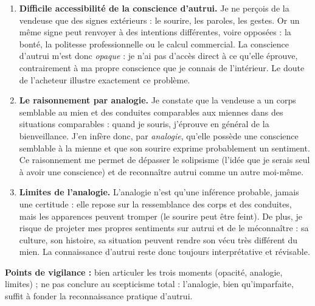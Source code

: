 \documentclass[11pt]{article}
\begin{document}
\begin{corrige}
\begin{enumerate}
\item \textbf{Difficile accessibilité de la conscience d'autrui.} Je ne perçois de la vendeuse que des signes extérieurs : le sourire, les paroles, les gestes. Or un même signe peut renvoyer à des intentions différentes, voire opposées : la bonté, la politesse professionnelle ou le calcul commercial. La conscience d'autrui m'est donc \emph{opaque} : je n'ai pas d'accès direct à ce qu'elle éprouve, contrairement à ma propre conscience que je connais de l'intérieur. Le doute de l'acheteur illustre exactement ce problème.
\item \textbf{Le raisonnement par analogie.} Je constate que la vendeuse a un corps semblable au mien et des conduites comparables aux miennes dans des situations comparables : quand je souris, j'éprouve en général de la bienveillance. J'en infère donc, par \emph{analogie}, qu'elle possède une conscience semblable à la mienne et que son sourire exprime probablement un sentiment. Ce raisonnement me permet de dépasser le solipsisme (l'idée que je serais seul à avoir une conscience) et de reconnaître autrui comme un autre moi-même.
\item \textbf{Limites de l'analogie.} L'analogie n'est qu'une inférence probable, jamais une certitude : elle repose sur la ressemblance des corps et des conduites, mais les apparences peuvent tromper (le sourire peut être feint). De plus, je risque de projeter mes propres sentiments sur autrui et de le méconnaître : sa culture, son histoire, sa situation peuvent rendre son vécu très différent du mien. La connaissance d'autrui reste donc toujours interprétative et révisable.
\end{enumerate}
\textbf{Points de vigilance :} bien articuler les trois moments (opacité, analogie, limites) ; ne pas conclure au scepticisme total : l'analogie, bien qu'imparfaite, suffit à fonder la reconnaissance pratique d'autrui.
\end{corrige}
\end{document}
